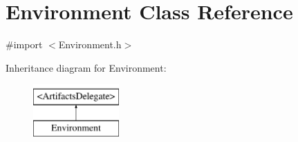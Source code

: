 \hypertarget{interface_environment}{
\section{\-Environment \-Class \-Reference}
\label{interface_environment}
}


{\ttfamily \#import $<$\-Environment.\-h$>$}

\-Inheritance diagram for \-Environment\-:\begin{figure}[H]
\begin{center}
\leavevmode
\includegraphics[height=2.000000cm]{interface_environment}
\end{center}
\end{figure}
